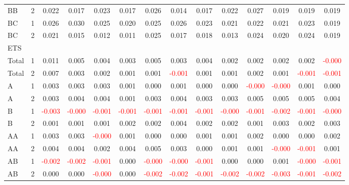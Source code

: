 \begin{table}[!htb]
{\begin{tabular}{llcccccccccccc}
BB & 2 & 0.022 & 0.017 & 0.023 & 0.017 & 0.026 & 0.014 & 0.017 & 0.022 & 0.027 & 0.019 & 0.019 & 0.019\\
BC & 1 & 0.026 & 0.030 & 0.025 & 0.020 & 0.025 & 0.026 & 0.023 & 0.021 & 0.022 & 0.021 & 0.023 & 0.019\\
BC & 2 & 0.021 & 0.015 & 0.012 & 0.011 & 0.025 & 0.017 & 0.018 & 0.013 & 0.024 & 0.020 & 0.024 & 0.019\\
\hline
ETS &  &  &  &  &  &  &  &  &  &  &  &  & \\
\hline
Total & 1 & 0.011 & 0.005 & 0.004 & 0.003 & 0.005 & 0.003 & 0.004 & 0.002 & 0.002 & 0.002 & 0.002 & \textcolor{red}{-0.000}\\
Total & 2 & 0.007 & 0.003 & 0.002 & 0.001 & 0.001 & \textcolor{red}{-0.001} & 0.001 & 0.001 & 0.002 & 0.001 & \textcolor{red}{-0.001} & \textcolor{red}{-0.001}\\
A & 1 & 0.003 & 0.003 & 0.003 & 0.001 & 0.000 & 0.001 & 0.000 & 0.000 & \textcolor{red}{-0.000} & \textcolor{red}{-0.000} & 0.001 & 0.000\\
A & 2 & 0.003 & 0.004 & 0.004 & 0.001 & 0.003 & 0.004 & 0.003 & 0.003 & 0.005 & 0.005 & 0.005 & 0.004\\
B & 1 & \textcolor{red}{-0.003} & \textcolor{red}{-0.000} & \textcolor{red}{-0.001} & \textcolor{red}{-0.001} & \textcolor{red}{-0.001} & \textcolor{red}{-0.001} & \textcolor{red}{-0.001} & \textcolor{red}{-0.000} & \textcolor{red}{-0.001} & \textcolor{red}{-0.002} & \textcolor{red}{-0.001} & \textcolor{red}{-0.000}\\
B & 2 & 0.001 & 0.001 & 0.001 & 0.002 & 0.002 & 0.004 & 0.002 & 0.002 & 0.001 & 0.003 & 0.002 & 0.003\\
AA & 1 & 0.003 & 0.003 & \textcolor{red}{-0.000} & 0.001 & 0.000 & 0.000 & 0.001 & 0.001 & 0.002 & 0.000 & 0.000 & 0.002\\
AA & 2 & 0.004 & 0.004 & 0.002 & 0.004 & 0.005 & 0.003 & 0.000 & 0.001 & 0.001 & \textcolor{red}{-0.000} & \textcolor{red}{-0.001} & 0.001\\
AB & 1 & \textcolor{red}{-0.002} & \textcolor{red}{-0.002} & \textcolor{red}{-0.001} & 0.000 & \textcolor{red}{-0.000} & \textcolor{red}{-0.000} & \textcolor{red}{-0.001} & 0.000 & 0.000 & 0.001 & \textcolor{red}{-0.000} & \textcolor{red}{-0.001}\\
AB & 2 & 0.000 & 0.000 & \textcolor{red}{-0.000} & 0.000 & \textcolor{red}{-0.002} & \textcolor{red}{-0.002} & \textcolor{red}{-0.001} & \textcolor{red}{-0.002} & \textcolor{red}{-0.002} & \textcolor{red}{-0.003} & \textcolor{red}{-0.001} & \textcolor{red}{-0.002}\\

\end{tabular}}
\end{table}
